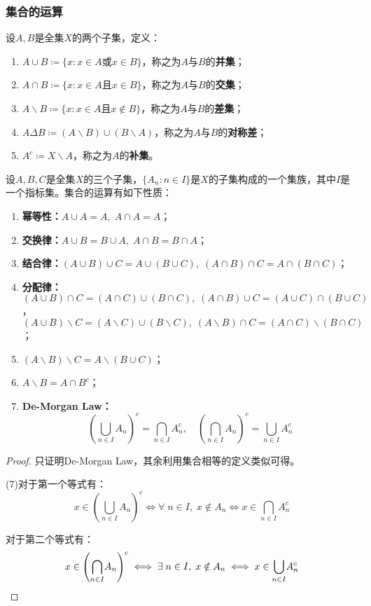 \subsubsection{集合的运算}
\begin{definition}
	设$A,B$是全集$X$的两个子集，定义：
	\begin{enumerate}
		\item $A\cup B\coloneq\{x:x\in A\text{或}x\in B\}$，称之为$A$与$B$的\textbf{并集}；
		\item $A\cap B\coloneq\{x:x\in A\text{且}x\in B\}$，称之为$A$与$B$的\textbf{交集}；
		\item $A\backslash B\coloneq\{x:x\in A\text{且}x\notin B\}$，称之为$A$与$B$的\textbf{差集}；
		\item $A\Delta B\coloneq (A\backslash B)\cup(B\backslash A)$，称之为$A$与$B$的\textbf{对称差}；
		\item $A^c\coloneq X\backslash A$，称之为$A$的\textbf{补集}。
	\end{enumerate}
\end{definition}
\begin{property}\label{prop:SetOperation}
	设$A,B,C$是全集$X$的三个子集，$\{A_n:n\in I\}$是$X$的子集构成的一个集族，其中$I$是一个指标集。集合的运算有如下性质：
	\begin{enumerate}
		\item \textbf{幂等性：}$A\cup A=A,\;A\cap A=A$；
		\item \textbf{交换律：}$A\cup B=B\cup A,\;A\cap B=B\cap A$；
		\item \textbf{结合律：}$(A\cup B)\cup C=A\cup(B\cup C),\;(A\cap B)\cap C=A\cap(B\cap C)$；
		\item \textbf{分配律：}$(A\cup B)\cap C=(A\cap C)\cup(B\cap C),\;(A\cap B)\cup C=(A\cup C)\cap(B\cup C)$，$(A\cup B)\backslash C=(A\backslash C)\cup(B\backslash C),\;(A\backslash B)\cap C=(A\cap C)\backslash(B\cap C)$；
		\item $(A\backslash B)\backslash C=A\backslash(B\cup C)$；
		\item $A\backslash B=A\cap B^c$；
		\item \textbf{De-Morgan Law：}
		\begin{equation*}
			\left(\underset{n\in I}{\bigcup}A_n\right)^c=\underset{n\in I}{\bigcap}A_n^c,\quad
			\left(\underset{n\in I}{\bigcap}A_n\right)^c=\underset{n\in I}{\bigcup}A_n^c
		\end{equation*}
	\end{enumerate}
\end{property}
\begin{proof}
	只证明De-Morgan Law，其余利用集合相等的定义类似可得。\par
	(7)对于第一个等式有：
	\begin{equation*}
		x\in\left(\underset{n\in I}{\bigcup}A_n\right)^c
		\iff
		\forall\;n\in I,\;x\notin A_n
		\iff
		x\in\underset{n\in I}{\bigcap}A_n^c
	\end{equation*}\par
	对于第二个等式有：
	\begin{equation*}
		x\in\left(\underset{n\in I}{\bigcap}A_n\right)^c
		\iff
		\exists\;n\in I,\;x\notin A_n
		\iff
		x\in\underset{n\in I}{\bigcup}A_n^c\qedhere
	\end{equation*}
\end{proof}

